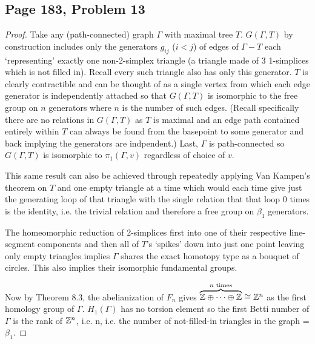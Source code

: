 \subsection*{Page 183, Problem 13}
\vspace{15pt}
\begin{proof}
    \vspace{-10pt}
    Take any (path-connected) graph $\Gamma$ with maximal tree $T$. $G(\Gamma,T)$ by construction includes only the generators $g_{ij}$ ($i <j$) of edges of $\Gamma-T$ each `representing' exactly one non-2-simplex triangle (a triangle made of 3 1-simplices which is not filled in). Recall every such triangle also has only this generator. $T$ is clearly contractible and can be thought of as a single vertex from which each edge generator is independently attached so that $G(\Gamma, T)$ is isomorphic to the free group on $n$ generators where $n$ is the number of such edges. (Recall specifically there are no relations in $G(\Gamma, T)$ as $T$ is maximal and an edge path contained entirely within $T$ can always be found from the basepoint to some generator and back implying the generators are indpendent.) Last, $\Gamma$ is path-connected so $G(\Gamma,T)$ is isomorphic to $\pi_1(\Gamma, v)$ regardless of choice of $v$. 
    
    This same result can also be achieved through repeatedly applying Van Kampen's theorem on $T$ and one empty triangle at a time which would each time give just the generating loop of that triangle with the single relation that that loop 0 times is the identity, i.e. the trivial relation and therefore a free group on $\beta_1$ generators.

    The homeomorphic reduction of 2-simplices first into one of their respective line-segment components and then all of $T$'s `spikes' down into just one point leaving only empty triangles implies $\Gamma$ shares the exact homotopy type as a bouquet of circles. This also implies their isomorphic fundamental groups.
        
    Now by Theorem 8.3, the abelianization of $F_n$ gives $\overbrace{\mathbb{Z} \oplus \cdots \oplus \mathbb{Z}}^{n \text{ times}} \cong \mathbb{Z}^n$ as the first homology group of $\Gamma$. $H_1(\Gamma)$ has no torsion element so the first Betti number of $\Gamma$ is the rank of $\mathbb{Z}^n$, i.e. n, i.e. the number of not-filled-in triangles in the graph = $\beta_1$. 

\end{proof}

